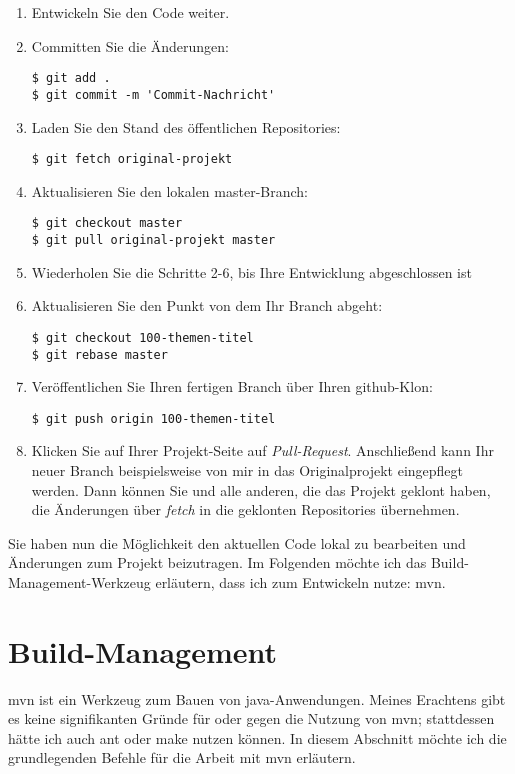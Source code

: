 \begin{enumerate}
\item Entwickeln Sie den Code weiter.

\item Committen Sie die Änderungen:
\begin{verbatim}
$ git add .
$ git commit -m 'Commit-Nachricht'
\end{verbatim}

\item Laden Sie den Stand des öffentlichen Repositories:
\begin{verbatim}
$ git fetch original-projekt
\end{verbatim}

\item Aktualisieren Sie den lokalen master-Branch:
\begin{verbatim}
$ git checkout master
$ git pull original-projekt master
\end{verbatim}

\item Wiederholen Sie die Schritte 2-6, bis Ihre Entwicklung abgeschlossen ist

\item Aktualisieren Sie den Punkt von dem Ihr Branch abgeht:
\begin{verbatim}
$ git checkout 100-themen-titel
$ git rebase master
\end{verbatim}

\item Veröffentlichen Sie Ihren fertigen Branch über Ihren github-Klon:
\begin{verbatim}
$ git push origin 100-themen-titel
\end{verbatim}

\item Klicken Sie auf Ihrer Projekt-Seite auf \emph{Pull-Request}. Anschließend kann Ihr neuer Branch beispielsweise von mir in das Originalprojekt eingepflegt werden. Dann können Sie und alle anderen, die das Projekt geklont haben, die Änderungen über \emph{fetch} in die geklonten Repositories übernehmen.
\end{enumerate}

Sie haben nun die Möglichkeit den aktuellen Code lokal zu bearbeiten und Änderungen zum Projekt beizutragen. Im Folgenden möchte ich das Build-Management-Werkzeug erläutern, dass ich zum Entwickeln nutze: \gls{mvn}.

\section{Build-Management}
\gls{mvn} ist ein Werkzeug zum Bauen von \gls{java}-Anwendungen. Meines Erachtens gibt es keine signifikanten Gründe für oder gegen die Nutzung von \gls{mvn}; stattdessen hätte ich auch \gls{ant} oder \gls{make} nutzen können. In diesem Abschnitt möchte ich die grundlegenden Befehle für die Arbeit mit \gls{mvn} erläutern.

